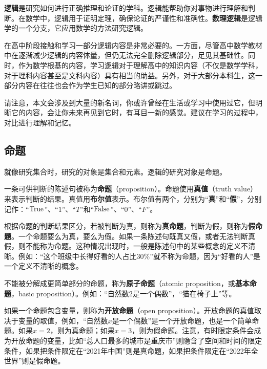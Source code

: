 

\begin{issues}
\issueDraft
\end{issues}


\textbf{逻辑}是研究如何进行正确推理和论证的学科。逻辑能帮助你对事物进行理解和判断。在数学中，逻辑用于证明定理，确保论证的严谨性和准确性。\textbf{数理逻辑}是逻辑学的一个分支，它应用数学的方法研究逻辑。

在高中阶段接触和学习一部分逻辑内容是非常必要的。一方面，尽管高中数学教材中在逐渐减少逻辑的内容体量，但仍无法完全删除逻辑部分，足见其基础性。同时，作为数学根基的内容，学习逻辑对于理解高中的知识内容（不仅是数学学科，对于理科内容甚至是文科内容）具有相当的助益。另外，对于大部分本科生，这一部分内容在往往也会作为学生已知的部分略讲或跳过。

请注意，本文会涉及到大量的新名词，你或许曾经在生活或学习中使用过它，但明晰它的内容，会让你未来再见到它时，有耳目一新的感觉。建议在学习的过程中，对比进行理解和记忆。

\subsection{命题}

就像研究集合时，研究的对象是集合和元素。逻辑的研究对象是命题。

一条可供判断的陈述句被称为\textbf{命题}（proposition）。命题使用\textbf{真值}（truth value）来表示判断的结果。真值用\textbf{布尔值}表示。布尔值有两个，分别为“\textbf{真}”和“\textbf{假}”，分别记作：“${\rm True}$”、“$1$”、“$T$”和“${\rm False}$”、“$0$”、“$F$”。

根据命题的判断结果区分，若被判断为真，则称为\textbf{真命题}，判断为假，则称为\textbf{假命题}。一个命题要么为真，要么为假。如果一条陈述句既真又假，或者无法判断真假，则不能称为命题。这种情况出现时，一般是陈述句中的某些概念的定义不清晰。例如：“这个班级中长得好看的人占比$30\%$”就不称为命题，因为“好看的人”是一个定义不清晰的概念。

不能被分解成更简单部分的命题，称为\textbf{原子命题}（atomic proposition，或\textbf{基本命题}，basic proposition）。例如：“自然数2是一个偶数”，“猫在椅子上”等。

如果一个命题包含变量，则称为\textbf{开放命题}（open proposition）。开放命题的真值取决于变量的取值，例如，“自然数$x$是一个偶数”是一个开放命题，也是一个简单命题。如果$x=2$，则为真命题；如果$x=3$，则为假命题。注意，有时限定条件会成为开放命题的变量，比如“总人口最多的城市是重庆市”则隐含了空间和时间的限定条件，如果把条件限定在“2021年中国”则是真命题，如果把条件限定在“2022年全世界”则是假命题。

